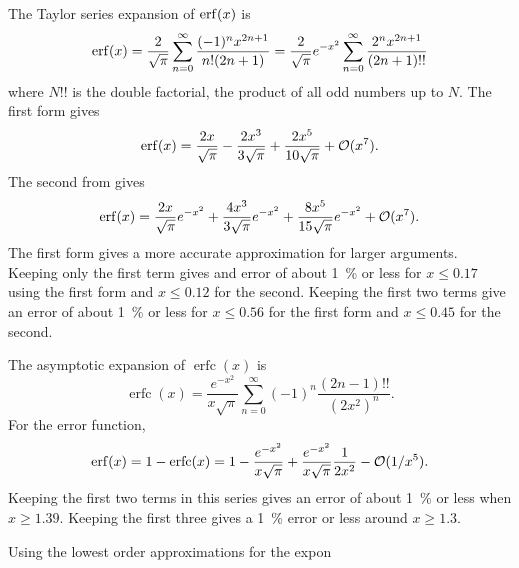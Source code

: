 \documentclass[]{article}
\DeclareMathOperator\erfc{erfc}
\begin{document}
The Taylor series expansion of $\erf(x)$ is
\begin{equation}
	\erf(x) = \frac{2}{\sqrt{\pi}} \sum_{n=0}^\infty \frac{(-1)^n x^{2n+1}} { n! (2n+1)} = \frac{2}{\sqrt{\pi}} e^{-x^2} \sum_{n=0}^{\infty} \frac{2^n x^{2n+1}}{(2n+1)!!}
\end{equation}
where $N!!$ is the double factorial, the product of all odd numbers up to $N$. 
The first form gives
\begin{equation}
	\erf(x) = \frac{2x}{\sqrt{\pi}} - \frac{2x^3}{3\sqrt{\pi}}   + \frac{2x^5}{10\sqrt{\pi}}  + \mathcal{O}(x^7).
\end{equation}
The second from gives
\begin{equation}
	\erf(x) = \frac{2x}{\sqrt{\pi}} e^{-x^2} + \frac{4x^3}{3\sqrt{\pi}} e^{-x^2}  + \frac{8x^5}{15\sqrt{\pi}} e^{-x^2}+  \mathcal{O}(x^7).
\end{equation}
The first form gives a more accurate approximation for larger arguments. Keeping only the first term gives and error of about \SI{1}{\percent} or less for $x \le 0.17$ using the first form and $x \le 0.12$ for the second. Keeping the first two terms give an error of about \SI{1}{\percent} or less for $x \le 0.56$ for the first form and $x \le 0.45$ for the second.

	
The asymptotic expansion of $\erfc(x)$ is
\begin{equation}
	\erfc(x) = \frac{e^{-x^2}}{x\sqrt{\pi}} \sum_{n=0}^{\infty} (-1)^n \frac{(2n-1)!!}{(2x^2)^n}.
\end{equation}
For the error function,
\begin{equation}
	\erf(x) = 1 - \erfc(x) = 1 - \frac{e^{-x^2}}{x\sqrt{\pi}} +  \frac{e^{-x^2}}{x\sqrt{\pi}} \frac{1}{2 x^2} - \mathcal{O}( 1/x^5).
\end{equation}
Keeping the first two terms in this series gives an error of about \SI{1}{\percent} or less when $x \ge 1.39$. Keeping the first three gives a \SI{1}{\percent} error or less around $x \ge 1.3$.

Using the lowest order approximations for the expon

\end{document}
